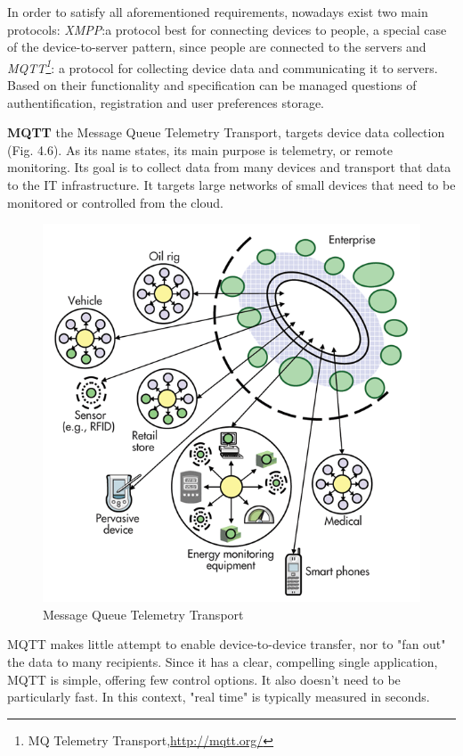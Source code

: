       In order to satisfy all aforementioned requirements, nowadays exist two main protocols: \emph{XMPP\cite{XMPPbook}}:a protocol best for connecting devices to people, a special case of the device-to-server pattern, since people are connected to the servers and \emph{MQTT\footnote{MQ Telemetry Transport,\url{http://mqtt.org/}}}: a protocol for collecting device data and communicating it to servers. Based on their functionality and specification can be managed questions of authentification, registration and user preferences storage.

      \textbf{MQTT}
      \newline
      the Message Queue Telemetry Transport, targets device data collection (Fig. 4.6). As its name states, its main purpose is telemetry, or remote monitoring. Its goal is to collect data from many devices and transport that data to the IT infrastructure. It targets large networks of small devices that need to be monitored or controlled from the cloud.
      \begin{figure}[!ht]
      \centering
      \includegraphics[scale=0.6]{images/MQTT.png}   
      \caption[Message Queue Telemetry Transport]{Message Queue Telemetry Transport}
      \label{img:MQTT}                           
      \end{figure}
      MQTT makes little attempt to enable device-to-device transfer, nor to "fan out" the data to many recipients. Since it has a clear, compelling single application, MQTT is simple, offering few control options. It also doesn’t need to be particularly fast. In this context, "real time" is typically measured in seconds.

